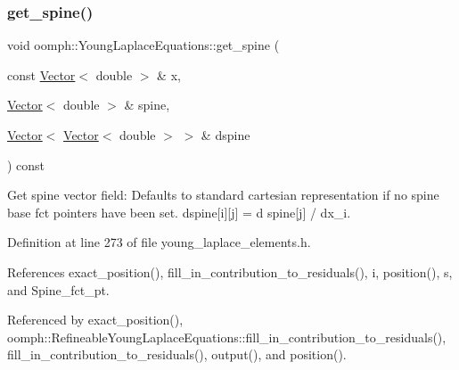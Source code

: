 \subsubsection{\texorpdfstring{get\+\_\+spine()}{get\_spine()}}
{\footnotesize\ttfamily void oomph\+::\+Young\+Laplace\+Equations\+::get\+\_\+spine (\begin{DoxyParamCaption}\item[{const \hyperlink{classoomph_1_1Vector}{Vector}$<$ double $>$ \&}]{x,  }\item[{\hyperlink{classoomph_1_1Vector}{Vector}$<$ double $>$ \&}]{spine,  }\item[{\hyperlink{classoomph_1_1Vector}{Vector}$<$ \hyperlink{classoomph_1_1Vector}{Vector}$<$ double $>$ $>$ \&}]{dspine }\end{DoxyParamCaption}) const\hspace{0.3cm}{\ttfamily [inline]}}



Get spine vector field\+: Defaults to standard cartesian representation if no spine base fct pointers have been set. dspine\mbox{[}i\mbox{]}\mbox{[}j\mbox{]} = d spine\mbox{[}j\mbox{]} / dx\+\_\+i. 



Definition at line 273 of file young\+\_\+laplace\+\_\+elements.\+h.



References exact\+\_\+position(), fill\+\_\+in\+\_\+contribution\+\_\+to\+\_\+residuals(), i, position(), s, and Spine\+\_\+fct\+\_\+pt.



Referenced by exact\+\_\+position(), oomph\+::\+Refineable\+Young\+Laplace\+Equations\+::fill\+\_\+in\+\_\+contribution\+\_\+to\+\_\+residuals(), fill\+\_\+in\+\_\+contribution\+\_\+to\+\_\+residuals(), output(), and position().

\mbox{\label{classoomph_1_1YoungLaplaceEquations_a4f9bb4d4617839296397c07cb2f2349c}} 
